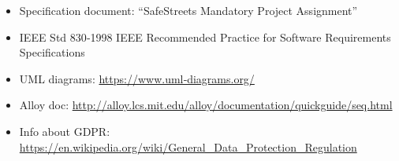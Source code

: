\begin{itemize}
    \item Specification document: “SafeStreets Mandatory Project Assignment”
    \item IEEE Std 830‐1998 IEEE Recommended Practice for Software Requirements Specifications
    \item UML diagrams: \url{https://www.uml‐diagrams.org/}
    \item Alloy doc: \url{http://alloy.lcs.mit.edu/alloy/documentation/quickguide/seq.html}
    \item Info about GDPR: \url{https://en.wikipedia.org/wiki/General_Data_Protection_Regulation} 
\end{itemize}